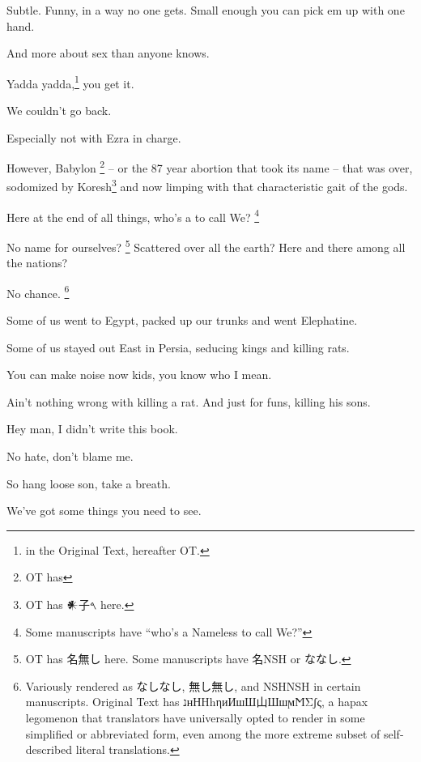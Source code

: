 {
    \hX{}
}
{
    \eX{}
}
{
        Subtle. Funny, in a way no one gets. Small enough you can pick em up with one hand.

        And more about sex than anyone knows.

        Yadda yadda,\footnote{ in the Original Text, hereafter OT.} you get it.
}

{
    \hX{}
}
{
    \eX{}
}
{
        We couldn't go back.

        Especially not with Ezra in charge.

        However, Babylon%
        \footnote{OT has }%
        -- or the 87 year abortion that took its name -- that was over,
        sodomized by Koresh\footnote{OT has 𒀭子𐤓 here.}
        and now limping with that characteristic gait of the gods.

        Here at the end of all things, who's a to call We?%
        \footnote{Some manuscripts have ``who's a Nameless to call We?''}

        No name for ourselves?%
        \footnote{OT has 名無し here. Some manuscripts have 名NSH or ななし.}
		Scattered over all the earth? Here and there among all the nations?

        No chance.%
        \footnote{
            Variously rendered as なしなし, 無し無し, and NSHNSH in certain manuscripts.
            Original Text has נнНΗhηиИшШ山ШшϻϺΣʃς, a hapax legomenon that translators
            have universally opted to render in some simplified or abbreviated form,
            even among the more extreme subset of self-described literal translations.
        }

        Some of us went to Egypt, packed up our trunks and went Elephatine.

        Some of us stayed out East in Persia, seducing kings and killing rats.

        You can make noise now kids, you know who I mean.

		Ain't nothing wrong with killing a rat. And just for funs, killing his sons.

        Hey man, I didn't write this book.
        
        No hate, don't blame me.

        So hang loose son, take a breath.
        
        We've got some things you need to see.
}


